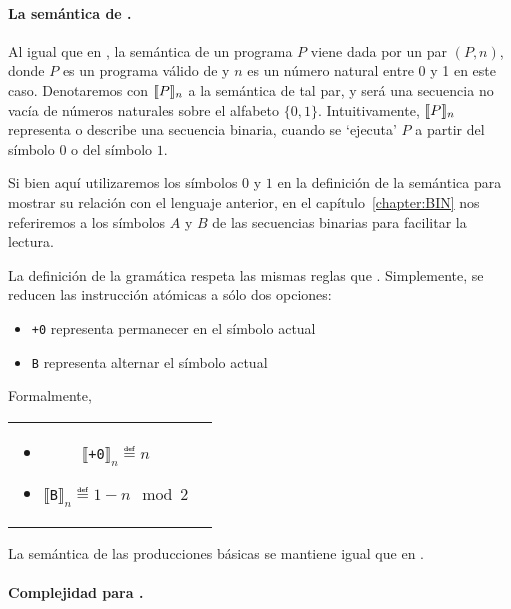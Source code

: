 \paragraph{La semántica de \grambin.}

Al igual que en \grambin, la semántica de un programa $P$ viene dada por un par $(P,n)$, donde $P$ es un programa válido de \grambin y $n$ es un número natural entre 0 y 1 en este caso. Denotaremos con $\llbracket P\rrbracket_n$ a la semántica de tal par, y será una secuencia no vacía de números naturales sobre el alfabeto $\{0,1\}$. Intuitivamente, $\llbracket P\rrbracket_n$ representa o describe una secuencia binaria, cuando se `ejecuta' $P$ a partir del símbolo $0$ o del símbolo $1$. 

Si bien aquí utilizaremos los símbolos $0$ y $1$ en la definición de la semántica para mostrar su relación con el lenguaje anterior, en el capítulo~\ref{chapter:BIN} nos referiremos a los símbolos $A$ y $B$ de las secuencias binarias para facilitar la lectura.

La definición de la gramática \grambin respeta las mismas reglas que \gramgeo. Simplemente, se reducen las instrucción atómicas a sólo dos opciones: 
\begin{itemize}

\item \verb#+0# representa permanecer en el símbolo actual

\item \verb#B# representa alternar el símbolo actual 

\end{itemize}

Formalmente,

\begin{tabular}{cc}
    \begin{minipage}[t]{0.45\textwidth}
        \begin{itemize}
        \item $\llbracket$\verb#+0#$\rrbracket_n  \eqdef  n$ 
        \item $\llbracket$\verb#B#$ \rrbracket_n  \eqdef  1-n \mod 2$  
        \end{itemize}
    \end{minipage}
\end{tabular}

\medskip

La semántica de las producciones básicas se mantiene igual que en \gramgeo.

\paragraph{Complejidad para \grambin.} 

